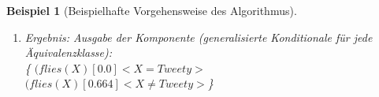 \documentclass[a4paper, 11pt]{book}
\newtheorem{Bsp}{Beispiel}[section]
\begin{document}
{\begin{Bsp}[Beispielhafte Vorgehensweise des Algorithmus]
\begin{enumerate}
\begin{quote}
			
			Positive Generalisierung:\\  
			$ (flies(X))[0.0]<X=Tweety> $\\
			$ flies(X)[0.664] <X=Bully \lor  X=Sylvester \lor X=Kirby> $\\
			Negative Generalisierung:\\  
			$ flies(X)[0.0] <X=Tweety> $\\
			$ flies(X)[0.664] <X \neq Tweety> $\\
			Logische Minimierung des Constraints\\
			Vergleich der Generalisierungen und Wahl derjenigen mit dem kürzeren Constraint\\
		\end{quote}
	\item Ergebnis: Ausgabe der Komponente (generalisierte Konditionale für jede Äquivalenzklasse):\\
	\{ $ (flies(X)[0.0] <X=Tweety> $\\
	$ (flies(X)[0.664] <X \neq Tweety> $\}
	
	\end{enumerate}
	
\end{Bsp}

}
\end{document}
